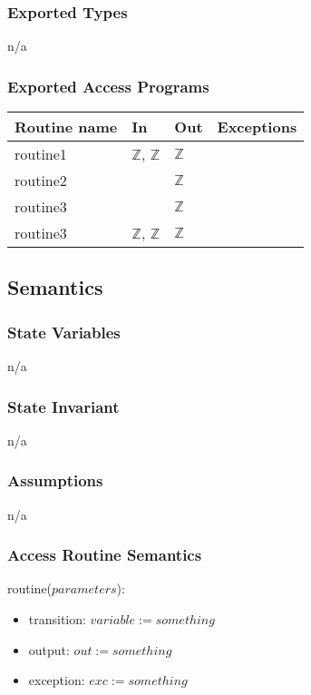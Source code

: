 \documentclass[12pt]{article}
\begin{document}
\subsubsection* {Exported Types}
n/a

\subsubsection* {Exported Access Programs}
\begin{tabular}{| l | l | l | l |}
\hline
\textbf{Routine name} & \textbf{In} & \textbf{Out} & \textbf{Exceptions}\\
\hline
routine1 & $\mathbb{Z}$, $\mathbb{Z}$ & $\mathbb{Z}$ & \\
\hline
routine2 & ~ & $\mathbb{Z}$ & ~\\
\hline
routine3 & ~ & $\mathbb{Z}$ & ~\\
\hline
routine3 & $\mathbb{Z}$, $\mathbb{Z}$ & $\mathbb{Z}$ & ~\\
\hline
\end{tabular}


\subsection* {Semantics}
\subsubsection* {State Variables}
n/a

\subsubsection* {State Invariant}
n/a

\subsubsection* {Assumptions}
n/a

\subsubsection* {Access Routine Semantics}
\noindent routine($parameters$):
\begin{itemize}
    \item transition: $variable := something$
    \item output: $out := something$
    \item exception: $exc := something$
\end{itemize}
\end{document}
